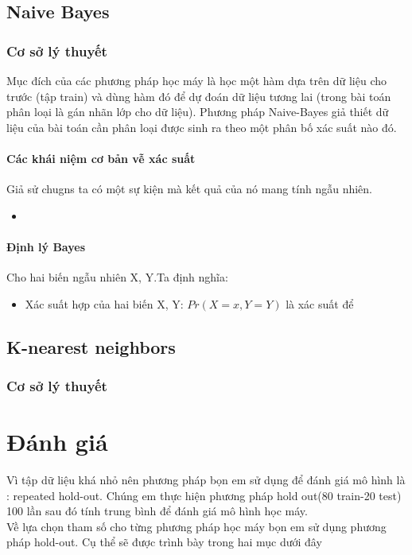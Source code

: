 \documentclass[a4paper,12pt]{report}
\begin{document}
\section{Naive Bayes}
\subsection{Cơ sở lý thuyết}
Mục đích của các phương pháp học máy là học một hàm dựa trên dữ liệu cho trước (tập train) và dùng hàm đó để dự đoán dữ liệu tương lai (trong bài toán phân loại là gán nhãn lớp cho dữ liệu). Phương pháp Naive-Bayes giả thiết dữ liệu của bài toán cần phân loại được sinh ra theo một phân bố xác suất nào đó. 
\subsubsection{Các khái niệm cơ bản vễ xác suất}
Giả sử chugns ta có một sự kiện mà kết quả của nó mang tính ngẫu nhiên.
\begin{itemize}
\item 
\end{itemize}
\subsubsection{Định lý Bayes}
Cho hai biến ngẫu nhiên X, Y.Ta định nghĩa:
\begin{itemize}
\item Xác suất hợp của hai biến X, Y: $Pr(X=x, Y=Y)$ là xác suất để 
\end{itemize}

\section{K-nearest neighbors}
\subsection{Cơ sở lý thuyết}
\chapter{Đánh giá}
Vì tập dữ liệu khá nhỏ nên phương pháp bọn em sử dụng để đánh giá mô hình là : repeated hold-out. Chúng em thực hiện phương pháp hold out(80 train-20 test) 100 lần sau đó tính trung bình để đánh giá mô hình học máy.\\

Về lựa chọn tham số cho từng phương pháp học máy bọn em sử dụng phương pháp hold-out. Cụ thể sẽ được trình bày trong hai mục dưới đây
\end{document}
